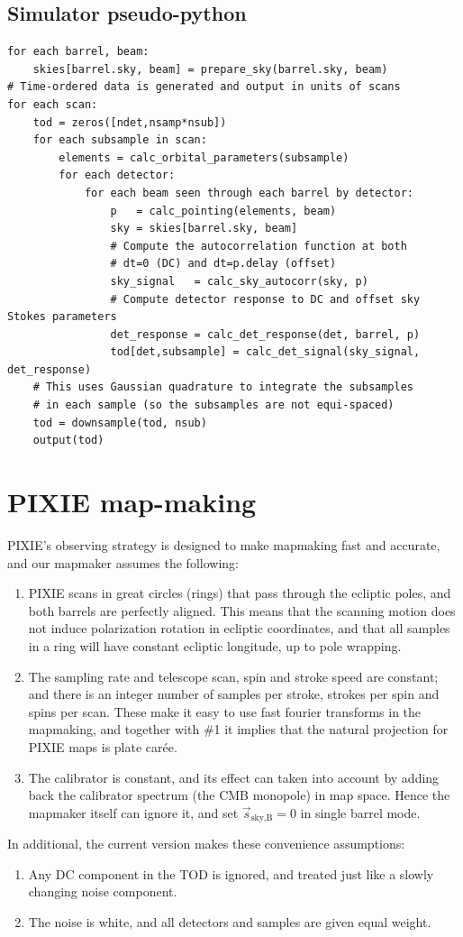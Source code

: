 \documentclass{article}
\begin{document}
\subsection{Simulator pseudo-python}
\begin{lstlisting}
for each barrel, beam:
	skies[barrel.sky, beam] = prepare_sky(barrel.sky, beam)
# Time-ordered data is generated and output in units of scans
for each scan:
	tod = zeros([ndet,nsamp*nsub])
	for each subsample in scan:
		elements = calc_orbital_parameters(subsample)
		for each detector:
			for each beam seen through each barrel by detector:
				p   = calc_pointing(elements, beam)
				sky = skies[barrel.sky, beam]
				# Compute the autocorrelation function at both
				# dt=0 (DC) and dt=p.delay (offset)
				sky_signal   = calc_sky_autocorr(sky, p)
				# Compute detector response to DC and offset sky Stokes parameters
				det_response = calc_det_response(det, barrel, p)
				tod[det,subsample] = calc_det_signal(sky_signal, det_response)
	# This uses Gaussian quadrature to integrate the subsamples
	# in each sample (so the subsamples are not equi-spaced)
	tod = downsample(tod, nsub)
	output(tod)
\end{lstlisting}

\section{PIXIE map-making}
PIXIE's observing strategy is designed to make mapmaking
fast and accurate, and our mapmaker assumes the following:
\begin{enumerate}
	\item PIXIE scans in great circles (rings) that pass through the ecliptic poles,
		and both barrels are perfectly aligned. This means that
		the scanning motion does not induce polarization rotation in ecliptic
		coordinates, and that all samples in a ring will have constant ecliptic
		longitude, up to pole wrapping. 
	\item The sampling rate and telescope scan, spin and stroke speed are constant;
		and there is an integer number of samples per stroke, strokes per spin and spins
		per scan. These make it easy to use fast fourier transforms
		in the mapmaking, and together with \#1 it implies that the natural
		projection for PIXIE maps is plate carée.
	\item The calibrator is constant, and its effect can taken into account by adding
		back the calibrator spectrum (the CMB monopole) in map space. Hence the
		mapmaker itself can ignore it, and set $\vec s_\textrm{sky,B}=0$ in
		single barrel mode.
\end{enumerate}
In additional, the current version makes these convenience assumptions:
\begin{enumerate}
	\item Any DC component in the TOD is ignored, and treated just like a slowly changing
		noise component.
	\item The noise is white, and all detectors and samples are given equal weight.
\end{enumerate}
\end{document}
